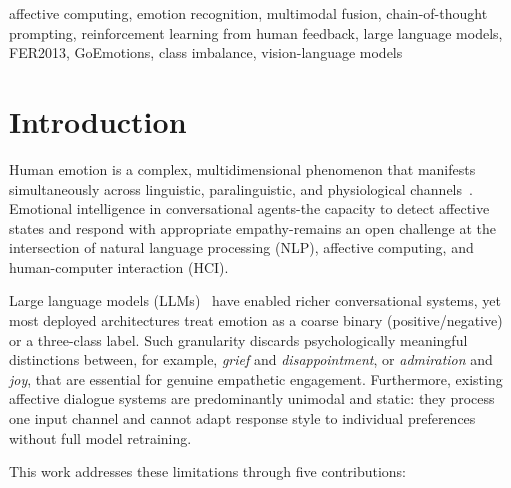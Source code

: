 \documentclass[conference]{IEEEtran}
\begin{document}
\begin{IEEEkeywords}
affective computing, emotion recognition, multimodal fusion,
chain-of-thought prompting, reinforcement learning from human
feedback, large language models, FER2013, GoEmotions, class
imbalance, vision-language models
\end{IEEEkeywords}

\section{Introduction}
\label{sec:intro}

Human emotion is a complex, multidimensional phenomenon that
manifests simultaneously across linguistic, paralinguistic, and
physiological channels~\cite{ekman1992}.
Emotional intelligence in conversational agents-the capacity to
detect affective states and respond with appropriate
empathy-remains an open challenge at the intersection of natural
language processing (NLP), affective computing, and
human-computer interaction (HCI).

Large language models (LLMs)~\cite{devlin2019bert,liu2019roberta}
have enabled richer conversational systems, yet most deployed
architectures treat emotion as a coarse binary (positive/negative)
or a three-class label.
Such granularity discards psychologically meaningful distinctions
between, for example, \emph{grief} and \emph{disappointment}, or
\emph{admiration} and \emph{joy}, that are essential for genuine
empathetic engagement.
Furthermore, existing affective dialogue systems are predominantly
unimodal and static: they process one input channel and cannot
adapt response style to individual preferences without full model
retraining.

This work addresses these limitations through five contributions:
\end{document}
